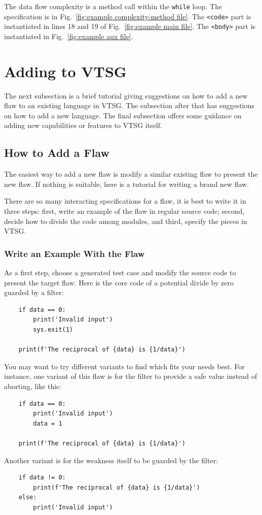 The data flow complexity is a method call within the \verb|while| loop.  
The specification
is in Fig.~\ref{fig:example complexity-method file}.  
The \verb|<code>|
part is instantiated in lines 18 and 19 of 
Fig.~\ref{fig:example main file}. 
The \verb|<body>| part is instantiated in
Fig.~\ref{fig:example aux file}.


\section{Adding to VTSG}

The next subsection is a brief tutorial giving suggestions on how to add a new
flaw to an existing language in VTSG.  The subsection after that has suggestions
on how to add a new language.  The final subsection offers some guidance on
adding new capabilities or features to VTSG itself.

\subsection{How to Add a Flaw}

The easiest way to add a new flaw is modify a similar existing flaw to present the
new flaw.  If nothing is suitable, here is a tutorial for writing a brand new flaw.

There are so many interacting specifications for a flaw, it is best to write it in
three steps: first, write an example of the flaw in regular source code; second,
decide how to
divide the code among modules, and third, specify the pieces in VTSG.

\subsubsection{Write an Example With the Flaw}

As a first step, choose a generated test case and modify the source code to present
the target flaw.  Here is the core code of
a potential divide by zero guarded by a filter:
\begin{verbatim}
    if data == 0:
        print('Invalid input')
        sys.exit(1)

    print(f'The reciprocal of {data} is {1/data}')
\end{verbatim}
You may want to try different variants to find which fits your needs best.  For
instance, one variant of this flaw is for the filter to provide a safe value instead
of aborting, like this:
\begin{verbatim}
    if data == 0:
        print('Invalid input')
        data = 1

    print(f'The reciprocal of {data} is {1/data}')
\end{verbatim}
Another variant is for the weakness itself to be guarded by the filter:
\begin{verbatim}
    if data != 0:
        print(f'The reciprocal of {data} is {1/data}')
    else:
        print('Invalid input')
\end{verbatim}

